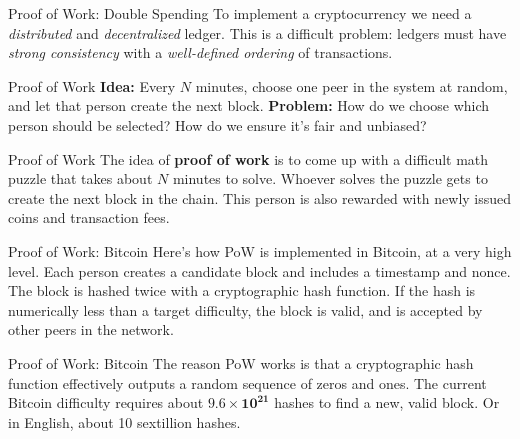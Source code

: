 \documentclass[14pt]{beamer}
\begin{document}
\begin{frame}{Proof of Work: Double Spending}
  To implement a cryptocurrency we need a \emph{distributed} and \emph{decentralized}
  ledger.
  \newline
  \newline
  This is a difficult problem: ledgers must  have \emph{strong consistency}
  with a \emph{well-defined ordering} of transactions.
\end{frame}

\begin{frame}{Proof of Work}
  \textbf{Idea:} Every $N$ minutes, choose one peer in the system at random, and
  let that person create the next block.
  \newline
  \newline
  \textbf{Problem:} How do we choose which person should be selected? How do we ensure it's fair and unbiased?
\end{frame}

\begin{frame}{Proof of Work}
  The idea of \textbf{proof of work} is to come up with a difficult math puzzle
  that takes about $N$ minutes to solve.
  \newline
  \newline
  Whoever solves the puzzle gets to create the next block in the chain.
  \newline
  \newline
  This person is also rewarded with newly issued coins and transaction fees.
\end{frame}

\begin{frame}{Proof of Work: Bitcoin}
  Here's how PoW is implemented in Bitcoin, at a very high level.
  \newline
  \newline
  Each person creates a candidate block and includes a timestamp and
  nonce. The block is hashed twice with a cryptographic hash
  function. If the hash is numerically less than a target difficulty,
  the block is valid, and is accepted by other peers in the network.
\end{frame}

\begin{frame}{Proof of Work: Bitcoin}
  The reason PoW works is that a cryptographic hash function effectively outputs
  a random sequence of zeros and ones.
  \newline
  \newline
  The current Bitcoin difficulty requires about $\mathbf{9.6 \times 10^{21}}$ hashes to find
  a new, valid block. Or in English, about 10 sextillion hashes.
\end{frame}
\end{document}
